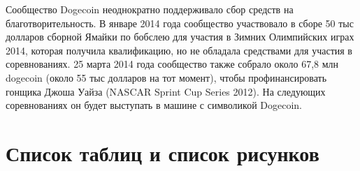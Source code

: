 \documentclass[12pt, a4paper]{article}
\begin{document}
Сообщество Dogecoin неоднократно поддерживало сбор средств на благотворительность. В январе 2014 года сообщество участвовало в сборе 50 тыс долларов сборной Ямайки по бобслею для участия в Зимних Олимпийских играх 2014, которая получила квалификацию, но не обладала средствами для участия в соревнованиях. 25 марта 2014 года сообщество также собрало около 67,8 млн dogecoin (около 55 тыс долларов на тот момент), чтобы профинансировать гонщика Джоша Уайза (NASCAR Sprint Cup Series 2012). На следующих соревнованиях он будет выступать в машине с символикой Dogecoin.


\section{Список таблиц и список рисунков}
\listoffigures

\listoftables

\tableofcontents
\end{document}
